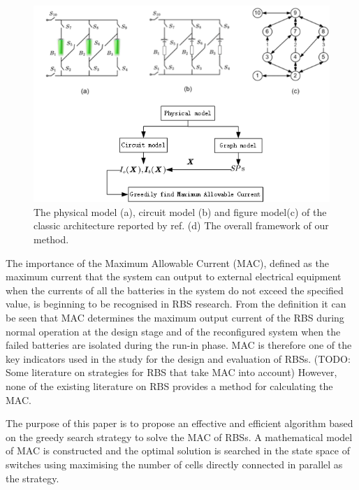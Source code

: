 \documentclass{article}
\begin{document}
\begin{figure}
    \centering
    \includegraphics[width=\textwidth]{../attachments/fig1.png}
    \caption{The physical model (a), circuit model (b) and figure model(c) of the classic architecture reported by ref. (d) The overall framework of our method.}
    \label{fig:1}
\end{figure}


The importance of the Maximum Allowable Current (MAC), defined as the maximum current that the system can output to external electrical equipment when the currents of all the batteries in the system do not exceed the specified value, is beginning to be recognised in RBS research. 
From the definition it can be seen that MAC determines the maximum output current of the RBS during normal operation at the design stage and of the reconfigured system when the failed batteries are isolated during the run-in phase. 
MAC is therefore one of the key indicators used in the study for the design and evaluation of RBSs.
(TODO: Some literature on strategies for RBS that take MAC into account)
However, none of the existing literature on RBS provides a method for calculating the MAC.


The purpose of this paper is to propose an effective and efficient algorithm based on the greedy search strategy to solve the MAC of RBSs. 
A mathematical model of MAC is constructed and the optimal solution is searched in the state space of switches using maximising the number of cells directly connected in parallel as the strategy.
\end{document}
